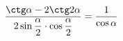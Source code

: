 \begin{ex}[type=prove_identity]
	\begin{condition}
		\( \dfrac{\ctg\alpha-2\ctg2\alpha}{2\sin\dfrac{\alpha}{2}\cdot\cos\dfrac{\alpha}{2}}=\dfrac{1}{\cos\alpha} \)
	\end{condition}
\end{ex}